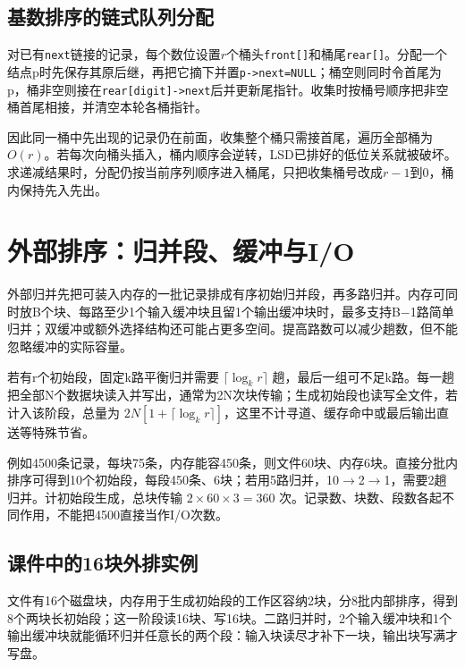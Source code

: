 \subsection{基数排序的链式队列分配}\label{DS08-radix-links}

对已有\texttt{next}链接的记录，每个数位设置\(r\)个桶头\texttt{front[\allowbreak{}]\allowbreak{}}和桶尾\texttt{rear[\allowbreak{}]\allowbreak{}}。分配一个结点p时先保存其原后继，再把它摘下并置\texttt{p->\allowbreak{}next=\allowbreak{}NULL}；桶空则同时令首尾为p，桶非空则接在\texttt{rear[\allowbreak{}digit]\allowbreak{}->\allowbreak{}next}后并更新尾指针。收集时按桶号顺序把非空桶首尾相接，并清空本轮各桶指针。

因此同一桶中先出现的记录仍在前面，收集整个桶只需接首尾，遍历全部桶为\(O(r)\)。若每次向桶头插入，桶内顺序会逆转，LSD已排好的低位关系就被破坏。求递减结果时，分配仍按当前序列顺序进入桶尾，只把收集桶号改成\(r-1\)到0，桶内保持先入先出。

\section{外部排序：归并段、缓冲与I/O}\label{DS08-10}

外部归并先把可装入内存的一批记录排成有序初始归并段，再多路归并。内存可同时放B个块、每路至少1个输入缓冲块且留1个输出缓冲块时，最多支持B\ensuremath{-}1路简单归并；双缓冲或额外选择结构还可能占更多空间。提高路数可以减少趟数，但不能忽略缓冲的实际容量。

若有r个初始段，固定k路平衡归并需要 \(\lceil\log_k r\rceil\) 趟，最后一组可不足k路。每一趟把全部N个数据块读入并写出，通常为2N次块传输；生成初始段也读写全文件，若计入该阶段，总量为 \(2N[1+\lceil\log_k r\rceil]\)，这里不计寻道、缓存命中或最后输出直送等特殊节省。

例如4500条记录，每块75条，内存能容450条，则文件60块、内存6块。直接分批内排序可得到10个初始段，每段450条、6块；若用5路归并，10\ensuremath{\to}2\ensuremath{\to}1，需要2趟归并。计初始段生成，总块传输 \(2\times60\times3=360\) 次。记录数、块数、段数各起不同作用，不能把4500直接当作I/O次数。

\subsection{课件中的16块外排实例}\label{DS08-external-course}

文件有16个磁盘块，内存用于生成初始段的工作区容纳2块，分8批内部排序，得到8个两块长初始段；这一阶段读16块、写16块。二路归并时，2个输入缓冲块和1个输出缓冲块就能循环归并任意长的两个段：输入块读尽才补下一块，输出块写满才写盘。

